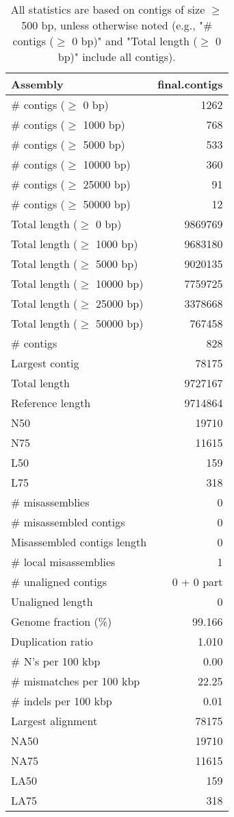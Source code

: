 \documentclass[12pt,a4paper]{article}
\begin{document}
\begin{table}[ht]
\begin{center}
\caption{All statistics are based on contigs of size $\geq$ 500 bp, unless otherwise noted (e.g., "\# contigs ($\geq$ 0 bp)" and "Total length ($\geq$ 0 bp)" include all contigs).}
\begin{tabular}{|l*{1}{|r}|}
\hline
Assembly & final.contigs \\ \hline
\# contigs ($\geq$ 0 bp) & 1262 \\ \hline
\# contigs ($\geq$ 1000 bp) & 768 \\ \hline
\# contigs ($\geq$ 5000 bp) & 533 \\ \hline
\# contigs ($\geq$ 10000 bp) & 360 \\ \hline
\# contigs ($\geq$ 25000 bp) & 91 \\ \hline
\# contigs ($\geq$ 50000 bp) & 12 \\ \hline
Total length ($\geq$ 0 bp) & 9869769 \\ \hline
Total length ($\geq$ 1000 bp) & 9683180 \\ \hline
Total length ($\geq$ 5000 bp) & 9020135 \\ \hline
Total length ($\geq$ 10000 bp) & 7759725 \\ \hline
Total length ($\geq$ 25000 bp) & 3378668 \\ \hline
Total length ($\geq$ 50000 bp) & 767458 \\ \hline
\# contigs & 828 \\ \hline
Largest contig & 78175 \\ \hline
Total length & 9727167 \\ \hline
Reference length & 9714864 \\ \hline
N50 & 19710 \\ \hline
N75 & 11615 \\ \hline
L50 & 159 \\ \hline
L75 & 318 \\ \hline
\# misassemblies & 0 \\ \hline
\# misassembled contigs & 0 \\ \hline
Misassembled contigs length & 0 \\ \hline
\# local misassemblies & 1 \\ \hline
\# unaligned contigs & 0 + 0 part \\ \hline
Unaligned length & 0 \\ \hline
Genome fraction (\%) & 99.166 \\ \hline
Duplication ratio & 1.010 \\ \hline
\# N's per 100 kbp & 0.00 \\ \hline
\# mismatches per 100 kbp & 22.25 \\ \hline
\# indels per 100 kbp & 0.01 \\ \hline
Largest alignment & 78175 \\ \hline
NA50 & 19710 \\ \hline
NA75 & 11615 \\ \hline
LA50 & 159 \\ \hline
LA75 & 318 \\ \hline
\end{tabular}
\end{center}
\end{table}
\end{document}
